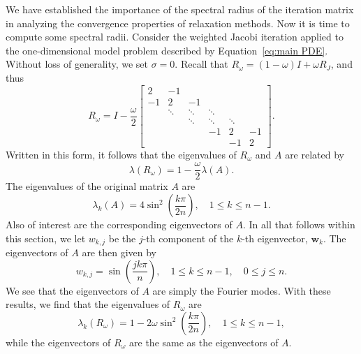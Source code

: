 \documentclass[letterpaper,12pt]{article}
\begin{document}
We have established the importance of the spectral radius of the iteration matrix in analyzing the convergence properties of relaxation methods. Now it is time to compute some spectral radii. Consider the weighted Jacobi iteration applied to the one-dimensional model problem described by Equation~\eqref{eq:main PDE}. Without loss of generality, we set $\sigma=0$. Recall that $R_{\omega}=(1-\omega) I+\omega R_{J}$, and thus
\begin{equation}
R_{\omega}=I-\frac{\omega}{2}\left[\begin{array}{cccccc}
2 & -1 & & & & \\
-1 & 2 & -1 & & & \\
& \ddots & \ddots & \ddots & & \\
& & \ddots & \ddots & \ddots & \\
& & & -1& 2 & -1 \\
& & & & -1 & 2
\end{array}\right].
\end{equation}
Written in this form, it follows that the eigenvalues of $R_{\omega}$ and $A$ are related by
\begin{equation}
\lambda\left(R_{\omega}\right)=1-\frac{\omega}{2} \lambda(A).
\end{equation}
The eigenvalues of the original matrix $A$ are 
\begin{equation}
\lambda_{k}(A)=4 \sin ^{2}\left(\frac{k \pi}{2 n}\right), \quad 1 \leq k \leq n-1.
\end{equation}
Also of interest are the corresponding eigenvectors of $A .$ In all that follows within this section, we let $w_{k, j}$ be the $j$-th component of the $k$-th eigenvector, $\mathbf{w}_{k}$. The eigenvectors of $A$ are then given by 
\begin{equation}
w_{k, j}=\sin \left(\frac{j k \pi}{n}\right), \quad 1 \leq k \leq n-1, \quad 0 \leq j \leq n.
\end{equation}
We see that the eigenvectors of $A$ are simply the Fourier modes. With these results, we find that the eigenvalues of $R_{\omega}$ are
\begin{equation}\label{eq:eigenvalues}
\lambda_{k}\left(R_{\omega}\right)=1-2 \omega \sin ^{2}\left(\frac{k \pi}{2 n}\right), \quad 1 \leq k \leq n-1,
\end{equation}
while the eigenvectors of $R_{\omega}$ are the same as the eigenvectors of $A$. 
\end{document}
